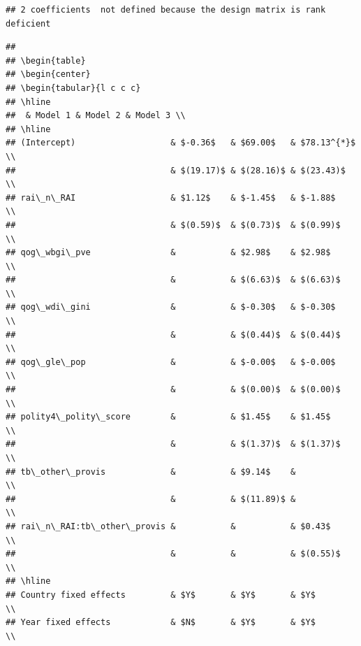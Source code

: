 \documentclass[
]{article}
\begin{document}
\begin{verbatim}
## 2 coefficients  not defined because the design matrix is rank deficient
\end{verbatim}

\begin{verbatim}
## 
## \begin{table}
## \begin{center}
## \begin{tabular}{l c c c}
## \hline
##  & Model 1 & Model 2 & Model 3 \\
## \hline
## (Intercept)                   & $-0.36$   & $69.00$   & $78.13^{*}$ \\
##                               & $(19.17)$ & $(28.16)$ & $(23.43)$   \\
## rai\_n\_RAI                   & $1.12$    & $-1.45$   & $-1.88$     \\
##                               & $(0.59)$  & $(0.73)$  & $(0.99)$    \\
## qog\_wbgi\_pve                &           & $2.98$    & $2.98$      \\
##                               &           & $(6.63)$  & $(6.63)$    \\
## qog\_wdi\_gini                &           & $-0.30$   & $-0.30$     \\
##                               &           & $(0.44)$  & $(0.44)$    \\
## qog\_gle\_pop                 &           & $-0.00$   & $-0.00$     \\
##                               &           & $(0.00)$  & $(0.00)$    \\
## polity4\_polity\_score        &           & $1.45$    & $1.45$      \\
##                               &           & $(1.37)$  & $(1.37)$    \\
## tb\_other\_provis             &           & $9.14$    &             \\
##                               &           & $(11.89)$ &             \\
## rai\_n\_RAI:tb\_other\_provis &           &           & $0.43$      \\
##                               &           &           & $(0.55)$    \\
## \hline
## Country fixed effects         & $Y$       & $Y$       & $Y$         \\
## Year fixed effects            & $N$       & $Y$       & $Y$         \\

\end{verbatim}
\end{document}
